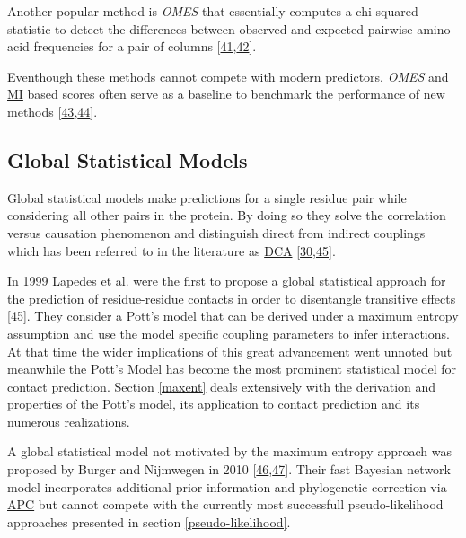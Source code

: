 \documentclass[12pt,a4paper,twoside]{book}
\theoremstyle{definition}
\theoremstyle{definition}
\theoremstyle{remark}
\begin{document}
Another popular method is \emph{OMES} that essentially computes a
chi-squared statistic to detect the differences between observed and
expected pairwise amino acid frequencies for a pair of columns
{[}\protect\hyperlink{ref-Kass2002}{41},\protect\hyperlink{ref-Noivirt2005}{42}{]}.

Eventhough these methods cannot compete with modern predictors,
\emph{OMES} and \protect\hyperlink{abbrev}{MI} based scores often serve
as a baseline to benchmark the performance of new methods
{[}\protect\hyperlink{ref-DeJuan2013}{43},\protect\hyperlink{ref-Jones2012}{44}{]}.

\subsection{Global Statistical Models}\label{global-methods}

Global statistical models make predictions for a single residue pair
while considering all other pairs in the protein. By doing so they solve
the correlation versus causation phenomenon and distinguish direct from
indirect couplings which has been referred to in the literature as
\protect\hyperlink{abbrev}{DCA}
{[}\protect\hyperlink{ref-Weigt2009}{30},\protect\hyperlink{ref-Lapedes1999}{45}{]}.

In 1999 Lapedes et al. were the first to propose a global statistical
approach for the prediction of residue-residue contacts in order to
disentangle transitive effects
{[}\protect\hyperlink{ref-Lapedes1999}{45}{]}. They consider a Pott's
model that can be derived under a maximum entropy assumption and use the
model specific coupling parameters to infer interactions. At that time
the wider implications of this great advancement went unnoted but
meanwhile the Pott's Model has become the most prominent statistical
model for contact prediction. Section \ref{maxent} deals extensively
with the derivation and properties of the Pott's model, its application
to contact prediction and its numerous realizations.

A global statistical model not motivated by the maximum entropy approach
was proposed by Burger and Nijmwegen in 2010
{[}\protect\hyperlink{ref-Burger2008}{46},\protect\hyperlink{ref-Burger2010}{47}{]}.
Their fast Bayesian network model incorporates additional prior
information and phylogenetic correction via
\protect\hyperlink{abbrev}{APC} but cannot compete with the currently
most successfull pseudo-likelihood approaches presented in section
\ref{pseudo-likelihood}.
\end{document}
